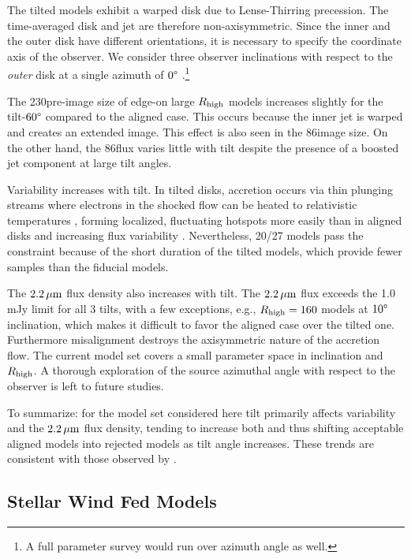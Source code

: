 The tilted models exhibit a warped disk due to  Lense-Thirring precession.
The time-averaged disk and jet are therefore non-axisymmetric.
Since the inner and the outer disk have different orientations, it is necessary to specify the coordinate axis of the observer.
We consider three  observer inclinations with respect to the {\em outer} disk at a single azimuth of $0\degree$ \citep[for more details, see][]{Chatterjee2020}.\footnote{A full parameter survey would run over azimuth angle as well.}

The 230\GHz pre-image size of edge-on large $R_\mathrm{high}$ models  increases slightly for the tilt-$60\degree$ compared to the aligned case.
This occurs because the inner jet is warped and creates an extended image.
This effect is also seen in the 86\GHz image size.
On the other hand, the 86\GHz flux varies little with tilt despite the presence of a boosted jet component at large tilt angles.

Variability increases with tilt.
In tilted disks, accretion occurs via thin plunging streams \citep[e.g.,][]{Fragile2007} where electrons in the shocked flow can be heated to relativistic temperatures \citep[e.g.,][]{Dexter2013, 2014ApJ...780...81G, White2019}, forming localized, fluctuating hotspots more easily than in aligned disks and increasing flux variability \citep{Chatterjee2020, 2022ApJ...925..119B}.  Nevertheless, 20/27 models pass the  constraint because of the short duration of the tilted models, which provide fewer  samples than the fiducial models.

The $2.2\,\mu\mathrm{m}$ flux density also increases with tilt.
The $2.2\,\mu\mathrm{m}$ flux exceeds the 1.0\,mJy limit for all 3 tilts, with a few exceptions, e.g., $R_\mathrm{high}=160$ models at $10\degree$ inclination, which makes it difficult to favor the aligned case over the tilted one.
Furthermore misalignment destroys the axisymmetric nature of the accretion flow.
The current model set covers a small parameter space in inclination and $R_\mathrm{high}$.
A thorough exploration of the source azimuthal angle with respect to the observer is left to future studies.

To summarize: for the model set considered here tilt primarily affects variability and the $2.2\,\mu\mathrm{m}$ flux density, tending to increase both and thus shifting acceptable aligned models into rejected models as tilt angle increases.
These trends are consistent with those observed by \cite{2022ApJ...926..136W}.

\subsection{Stellar Wind Fed Models}

